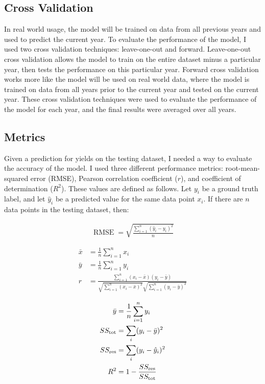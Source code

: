 \documentclass[letterpaper]{article}
\begin{document}
\subsection{Cross Validation}

In real world usage, the model will be trained on data from all previous years and used to predict the current year. To evaluate the performance of the model, I used two cross validation techniques: leave-one-out and forward. Leave-one-out cross validation allows the model to train on the entire dataset minus a particular year, then tests the performance on this particular year. Forward cross validation works more like the model will be used on real world data, where the model is trained on data from all years prior to the current year and tested on the current year. These cross validation techniques were used to evaluate the performance of the model for each year, and the final results were averaged over all years.

\subsection{Metrics}

Given a prediction for yields on the testing dataset, I needed a way to evaluate the accuracy of the model. I used three different performance metrics: root-mean-squared error (RMSE), Pearson correlation coefficient ($r$), and coefficient of determination ($R^2$). These values are defined as follows. Let $y_i$ be a ground truth label, and let $\hat{y}_i$ be a predicted value for the same data point $x_i$. If there are $n$ data points in the testing dataset, then:

\begin{align*}
\operatorname{RMSE} = \sqrt{\frac{\sum_{i=1}^n (\hat y_i - y_i)^2}{n}}
\end{align*}

\begin{align*}
\bar{x} &= \frac{1}{n}\sum_{i=1}^n x_i \\
\bar{y} &= \frac{1}{n}\sum_{i=1}^n y_i \\
r &= \frac{\sum ^n _{i=1}(x_i - \bar{x})(y_i - \bar{y})}{\sqrt{\sum ^n _{i=1}(x_i - \bar{x})^2} \sqrt{\sum ^n _{i=1}(y_i - \bar{y})^2}}
\end{align*}

\begin{align*}
\bar{y} &= \frac{1}{n}\sum_{i=1}^n y_i \\
SS_\text{tot} &= \sum_i (y_i-\bar{y})^2 \\
SS_\text{res} &= \sum_i (y_i - \hat y_i)^2 \\
R^2 &= 1 - \frac{SS_{\rm res}}{SS_{\rm tot}}
\end{align*}
\end{document}
